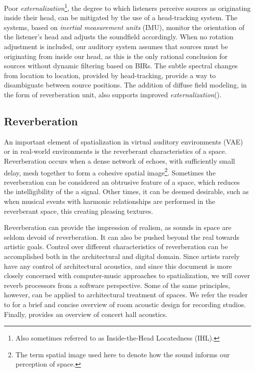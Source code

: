 
Poor \textit{externalization}\footnote{Also sometimes referred to as Inside-the-Head Locatedness (IHL).}, the degree to which listeners perceive sources as originating inside their head, can be mitigated by the use of a head-tracking system. The systems, based on \textit{inertial measurement units} (IMU), monitor the orientation of the listener's head and adjusts the soundfield accordingly. When no rotation adjustment is included, our auditory system assumes that sources must be originating from inside our head, as this is the only rational conclusion for sources without dynamic filtering based on BIRs. The subtle spectral changes from location to location, provided by head-tracking, provide a way to disambiguate between source positions. The addition of diffuse field modeling, in the form of reverberation unit, also supports improved \textit{externalization}(\cite{sakamoto1976out}). 

\subsection{Reverberation}

An important element of spatialization in virtual auditory environments (VAE) or in real-world environments is the reverberant characteristics of a space. Reverberation occurs when a dense network of echoes, with sufficiently small delay, mesh together to form a cohesive spatial image\footnote{The term spatial image used here to denote how the sound informs our perception of space.}. Sometimes the reverberation can be considered an obtrusive feature of a space, which reduces the intelligibility of the a signal. Other times, it can be deemed desirable, such as when musical events with harmonic relationships are performed in the reverberant space, this creating pleasing textures. 

Reverberation can provide the impression of realism, as sounds in space are seldom devoid of reverberation. It can also be pushed beyond the real towards artistic goals. Control over different characteristics of reverberation can be accomplished both in the architectural and digital domain. Since artists rarely have any control of architectural acoustics, and since this document is more closely concerned with computer-music approaches to spatialization, we will cover reverb processors from a software perspective. Some of the same principles, however, can be applied to architectural treatment of spaces. We refer the reader to \cite{gupta2019analysis} for a brief and concise overview of room acoustic design for recording studios. Finally, \cite{beranek1992concert} provides an overview of concert hall acoustics. 

